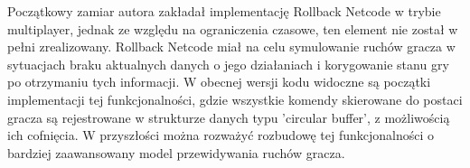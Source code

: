 Początkowy zamiar autora zakładał implementację Rollback Netcode \cite{Rollback} w trybie multiplayer, jednak ze względu na ograniczenia czasowe, ten element nie został w pełni zrealizowany. Rollback Netcode miał na celu symulowanie ruchów gracza w sytuacjach braku aktualnych danych o jego działaniach i korygowanie stanu gry po otrzymaniu tych informacji. W obecnej wersji kodu widoczne są początki implementacji tej funkcjonalności, gdzie wszystkie komendy skierowane do postaci gracza są rejestrowane w strukturze danych typu 'circular buffer', z możliwością ich cofnięcia. W przyszłości można rozważyć rozbudowę tej funkcjonalności o bardziej zaawansowany model przewidywania ruchów gracza.

